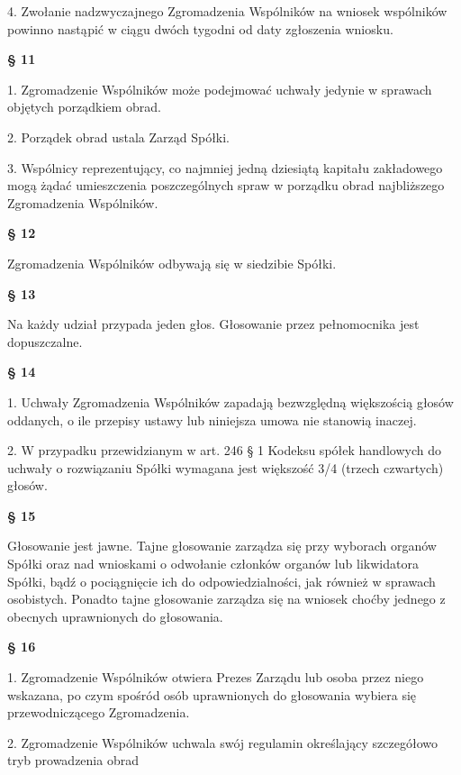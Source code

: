 4. Zwołanie nadzwyczajnego Zgromadzenia Wspólników na wniosek wspólników powinno nastąpić w ciągu dwóch tygodni od daty zgłoszenia wniosku.\\

\centerline{\large\textbf{§ 11}}

1. Zgromadzenie Wspólników może podejmować uchwały jedynie w sprawach objętych porządkiem obrad.

2. Porządek obrad ustala Zarząd Spółki.

3. Wspólnicy reprezentujący, co najmniej jedną dziesiątą kapitału zakładowego mogą żądać umieszczenia poszczególnych spraw w porządku obrad najbliższego Zgromadzenia Wspólników.\\

\centerline{\large\textbf{§ 12}}

Zgromadzenia Wspólników odbywają się w siedzibie Spółki.\\

\centerline{\large\textbf{§ 13}}

Na każdy udział przypada jeden głos. Głosowanie przez pełnomocnika jest dopuszczalne.\\

\centerline{\large\textbf{§ 14}}

1. Uchwały Zgromadzenia Wspólników zapadają bezwzględną większością głosów oddanych, o ile przepisy ustawy lub niniejsza umowa nie stanowią inaczej.

2. W przypadku przewidzianym w art. 246 § 1 Kodeksu spółek handlowych do uchwały
o rozwiązaniu Spółki wymagana jest większość 3/4 (trzech czwartych) głosów.

\centerline{\large\textbf{§ 15}}

Głosowanie jest jawne. Tajne głosowanie zarządza się przy wyborach organów Spółki oraz nad wnioskami o odwołanie członków organów lub likwidatora Spółki, bądź  o pociągnięcie ich do odpowiedzialności, jak również w sprawach osobistych. Ponadto tajne głosowanie zarządza się na wniosek choćby jednego z obecnych uprawnionych do głosowania.\\

\centerline{\large\textbf{§ 16}}

1.      Zgromadzenie Wspólników otwiera Prezes Zarządu lub osoba przez niego wskazana, po czym spośród osób uprawnionych do głosowania wybiera się przewodniczącego Zgromadzenia.

2.      Zgromadzenie Wspólników uchwala swój regulamin określający szczegółowo tryb prowadzenia obrad\\

